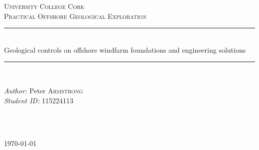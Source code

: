 \documentclass[12pt]{article} %
\newlength{\wideitemsep}
\let\olditem\item
\renewcommand{\item}{\setlength{\itemsep}{\wideitemsep}\olditem}
\begin{document}

\begin{titlepage}
  \newcommand{\HRule}{\rule{\linewidth}{0.5mm}} %

  \center %

  \textsc{\LARGE University College Cork}\\[1.5cm] %
  \textsc{\Large Practical Offshore Geological Exploration}\\[0.5cm] %

  \HRule \\[0.4cm]
  { \huge Geological controls on offshore windfarm foundations and engineering solutions}\\[0.5cm] %
  \HRule \\[1.5cm]

  \begin{minipage}{0.4\textwidth}
  \begin{flushleft} \large
  \emph{Author:} Peter \textsc{Armstrong} \\%
  \emph{Student ID:} 115224113
  \end{flushleft}
  \end{minipage}
  ~
  \begin{minipage}{0.4\textwidth}
  \begin{flushright} \large
  \end{flushright}
  \end{minipage}\\[4cm]

  {\large \today}\\[3cm] %


  \vfill %

\newlength{\wideitemsep}
\setlength{\wideitemsep}{.5\itemsep}
\addtolength{\wideitemsep}{-7pt}
\let\olditem\item
\renewcommand{\item}{\setlength{\itemsep}{\wideitemsep}\olditem}

\end{titlepage}
\end{document}
